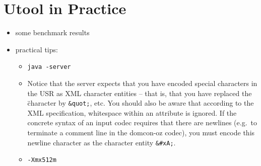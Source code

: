 
\section{Utool in Practice} \label{sec:practice}

\begin{itemize}
\item some benchmark results
\item practical tips:
\begin{itemize}
\item \verb?java -server?
\item Notice that the server expects that you have encoded special
characters in the USR as XML character entities -- that is, that you
have replaced the \" character by \verb?&quot;?, etc. You should also
be aware that according to the XML specification, whitespace within an attribute is ignored. If the concrete syntax of an input codec requires that there are newlines (e.g.\ to terminate a comment line in the domcon-oz codec), you must encode this newline character as the character entity \verb?&#xA;?.
\item \verb?-Xmx512m?
\end{itemize}
\end{itemize}



